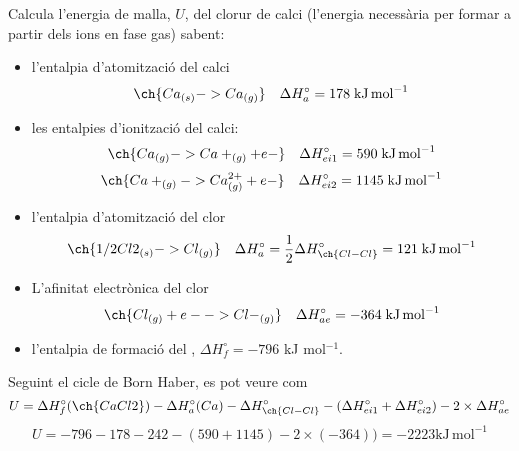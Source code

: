 \documentclass[11pt]{article}
\begin{document}
{Calcula l'energia de malla, $U$, del clorur de calci (l'energia necessària per formar  a partir dels ions en fase gas) sabent:
\begin{itemize}
\item l'entalpia d'atomització del calci
\[\ch{Ca_{(s)} -> Ca_{(g)}} \quad \Delta H_a^{\circ}=178\; \mathrm{kJ \, mol}^{-1}\]
\item les entalpies d'ionització del calci: 
\[\ch{Ca_{(g)} -> Ca+ _{(g)} + e-} \quad \Delta H_{ei1}^{\circ}=590 \; \mathrm{kJ \, mol}^{-1}\]
\[\ch{Ca+ _{(g)} -> Ca^{2+} _{(g)} + e-} \quad \Delta H_{ei2}^{\circ}=1145 \; \mathrm{kJ \, mol}^{-1}\]
\item l'entalpia d'atomització del clor
\[\ch{1/2 Cl2_{(s)} -> Cl_{(g)}} \quad \Delta H_a^{\circ}=\frac{1}{2} \Delta H_{\ch{Cl-Cl}}^{\circ}=121 \; \mathrm{kJ \, mol}^{-1}\]
\item L'afinitat electrònica del clor
\[\ch{Cl_{(g)} + e-  -> Cl-_{(g)}} \quad \Delta H_{ae}^{\circ}=-364 \; \mathrm{kJ \, mol}^{-1}\]
\item l'entalpia de formació del , $\Delta H_f^{\circ}=-796$ kJ mol$^{-1}$.
\end{itemize}
}
{
\vfill
\newpage
}
{
Seguint el cicle de Born Haber, es pot veure com
\[U=\Delta H_f^{\circ} (\ch{CaCl2}) - \Delta H_a^{\circ} (Ca) - \Delta H_{\ch{Cl-Cl}}^{\circ} - (\Delta H_{ei1}^{\circ}+\Delta H_{ei2}^{\circ})-2 \times \Delta H_{ae}^{\circ}\]
\[U=-796-178-242-(590+1145)-2\times (-364))=-2223\mathrm{kJ \, mol}^{-1}\]
}
\end{document}
